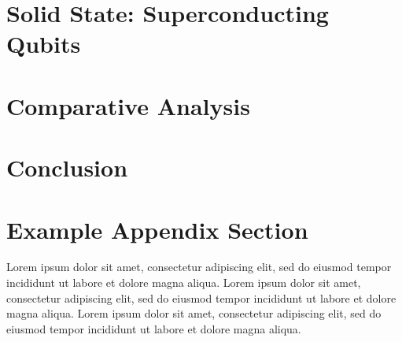 \documentclass[
  journal=largetwo,
  year=2023,
]{cup-journal}
\begin{document}
\section{Solid State: Superconducting Qubits}

\section{Comparative Analysis}

\section{Conclusion}

\printendnotes

\printbibliography

\appendix

\section{Example Appendix Section}

Lorem ipsum dolor sit amet, consectetur adipiscing elit, sed do eiusmod tempor incididunt ut labore et dolore magna aliqua. Lorem ipsum dolor sit amet, consectetur adipiscing elit, sed do eiusmod tempor incididunt ut labore et dolore magna aliqua. Lorem ipsum dolor sit amet, consectetur adipiscing elit, sed do eiusmod tempor incididunt ut labore et dolore magna aliqua.
\end{document}
